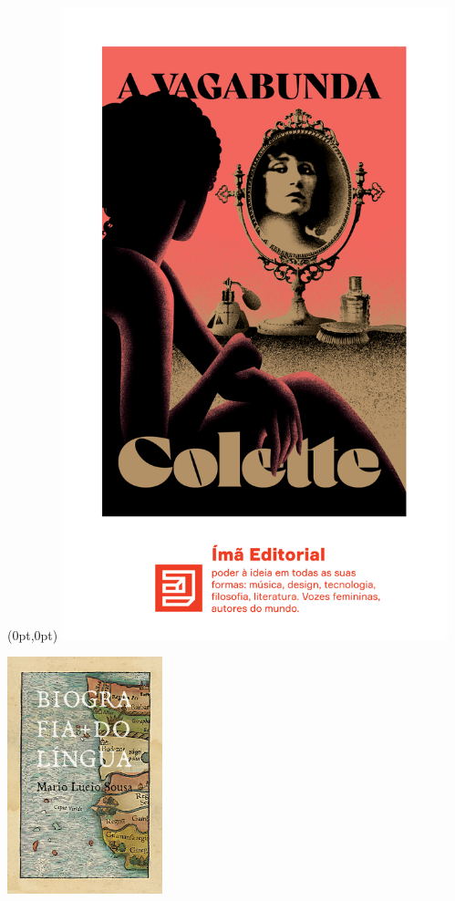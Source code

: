 \pagestyle{ima}
\label{ima}

\begin{textblock*}{5.625in}(0pt,0pt)%
\vspace*{-1.45cm}
\hspace*{-1.2cm}\includegraphics*[width=112mm]{./imgs/IMA.png}
\end{textblock*}

\pagebreak

\hspace{.5cm}

\begin{center}
\hspace*{-.5cm}\includegraphics[width=45mm]{./imgs/lingua.jpg}
\end{center}

